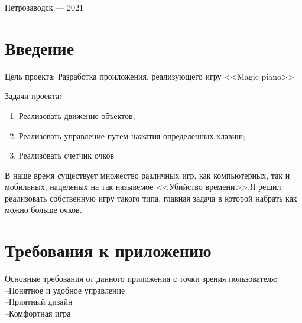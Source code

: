 \documentclass[a4paper,12pt]{article}
\begin{document}
\vfill

\begin{center}
\large
    Петрозаводск --- 2021
\end{center}



\newpage

\tableofcontents





\newpage
\section*{Введение}

Цель проекта: Разработка проиложения, реализующего игру <<Magic piano>>

Задачи проекта: 
\begin{enumerate} 
    \item Реализовать движение объектов;
    \item Реализовать управление путем нажатия определенных клавиш;
    \item Реализовать счетчик очков
\end{enumerate}
    \item В наше время существует множество различных игр, как компьютерных, так и мобильных, нацеленых на так назывемое <<Убийство времени>>.Я решил реализовать собственную игру такого типа, главная задача в которой набрать как можно больше очков.



\newpage
\section{Требования к приложению}
Основные требования от данного приложения с точки зрения пользователя: \\
--Понятное и удобное управление \\
--Приятный дизайн \\
--Комфортная игра
\end{document}

